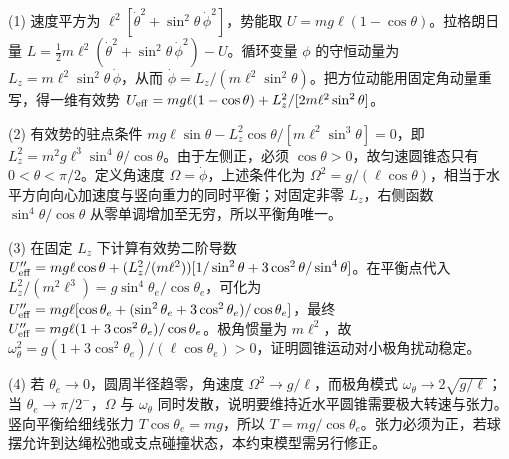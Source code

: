 (1) 速度平方为 \(\ell^2[\dot\theta^2+\sin^2\theta\,\dot\phi^2]\)，势能取 \(U=mg\ell(1-\cos\theta)\)。拉格朗日量 \(L=\frac12m\ell^2(\dot\theta^2+\sin^2\theta\,\dot\phi^2)-U\)。循环变量 \(\phi\) 的守恒动量为 \(L_z=m\ell^2\sin^2\theta\,\dot\phi\)，从而 \(\dot\phi=L_z/(m\ell^2\sin^2\theta)\)。把方位动能用固定角动量重写，得一维有效势 \(U_{\rm eff}=mg\ell(1-\cos\theta)+L_z^2/[2m\ell^2\sin^2\theta]\)。

(2) 有效势的驻点条件 \(mg\ell\sin\theta-L_z^2\cos\theta/[m\ell^2\sin^3\theta]=0\)，即 \(L_z^2=m^2g\ell^3\sin^4\theta/\cos\theta\)。由于左侧正，必须 \(\cos\theta>0\)，故匀速圆锥态只有 \(0<\theta<\pi/2\)。定义角速度 \(\Omega=\dot\phi\)，上述条件化为 \(\Omega^2=g/(\ell\cos\theta)\)，相当于水平方向向心加速度与竖向重力的同时平衡；对固定非零 \(L_z\)，右侧函数 \(\sin^4\theta/\cos\theta\) 从零单调增加至无穷，所以平衡角唯一。

(3) 在固定 \(L_z\) 下计算有效势二阶导数 \(U_{\rm eff}''=mg\ell\cos\theta+(L_z^2/(m\ell^2))[1/\sin^2\theta+3\cos^2\theta/\sin^4\theta]\)。在平衡点代入 \(L_z^2/(m^2\ell^3)=g\sin^4\theta_e/\cos\theta_e\)，可化为 \(U_{\rm eff}''=mg\ell[\cos\theta_e+(\sin^2\theta_e+3\cos^2\theta_e)/\cos\theta_e]\)，最终 \(U_{\rm eff}''=mg\ell(1+3\cos^2\theta_e)/\cos\theta_e\)。极角惯量为 \(m\ell^2\)，故 \(\omega_\theta^2=g(1+3\cos^2\theta_e)/(\ell\cos\theta_e)>0\)，证明圆锥运动对小极角扰动稳定。

(4) 若 \(\theta_e\to0\)，圆周半径趋零，角速度 \(\Omega^2\to g/\ell\)，而极角模式 \(\omega_\theta\to2\sqrt{g/\ell}\)；当 \(\theta_e\to\pi/2^-\)，\(\Omega\) 与 \(\omega_\theta\) 同时发散，说明要维持近水平圆锥需要极大转速与张力。竖向平衡给细线张力 \(T\cos\theta_e=mg\)，所以 \(T=mg/\cos\theta_e\)。张力必须为正，若球摆允许到达绳松弛或支点碰撞状态，本约束模型需另行修正。
